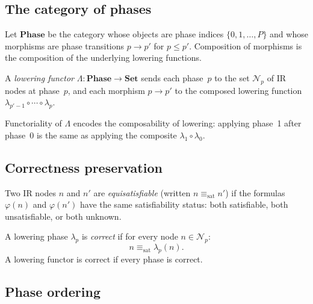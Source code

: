 \documentclass[11pt]{article}
\begin{document}
\subsection{The category of phases}

\begin{definition}\label{def:phasecat}
Let $\mathbf{Phase}$ be the category whose objects are
phase indices $\{0, 1, \ldots, P\}$ and whose morphisms
are phase transitions $p \to p'$ for $p \leq p'$.
Composition of morphisms is the composition of the
underlying lowering functions.
\end{definition}

\begin{definition}\label{def:lowfunctor}
A \emph{lowering functor}
$\Lambda \colon \mathbf{Phase} \to \mathbf{Set}$
sends each phase~$p$ to the set $\mathcal{N}_p$ of IR
nodes at phase~$p$, and each morphism $p \to p'$ to the
composed lowering function
$\lambda_{p'-1} \circ \cdots \circ \lambda_p$.
\end{definition}

\begin{remark}
Functoriality of $\Lambda$ encodes the composability of
lowering: applying phase~1 after phase~0 is the same as
applying the composite $\lambda_1 \circ \lambda_0$.
\end{remark}

\subsection{Correctness preservation}

\begin{definition}[Equisatisfiability]\label{def:equisat}
Two IR nodes $n$ and $n'$ are \emph{equisatisfiable}
(written $n \equiv_{\mathrm{sat}} n'$) if the formulas
$\varphi(n)$ and $\varphi(n')$ have the same satisfiability
status: both satisfiable, both unsatisfiable, or both unknown.
\end{definition}

\begin{definition}\label{def:corrlower}
A lowering phase $\lambda_p$ is \emph{correct} if for every
node $n \in \mathcal{N}_p$:
\[
  n \equiv_{\mathrm{sat}} \lambda_p(n).
\]
A lowering functor is correct if every phase is correct.
\end{definition}

\subsection{Phase ordering}
\end{document}
